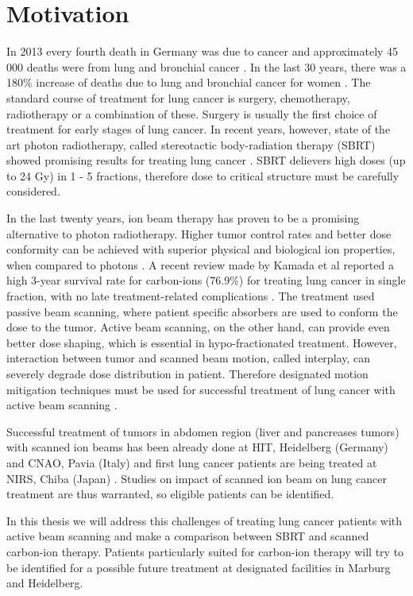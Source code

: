 \section*{Motivation}
In 2013 every fourth death in Germany was due to cancer and approximately 45 000 deaths were from lung and bronchial cancer \cite{Destatis2015}. In the last 30 years, there was a 180\% increase of deaths due to lung and bronchial cancer for women \cite{Destatis2015}.
The standard course of treatment for lung cancer is surgery, chemotherapy, radiotherapy or a combination of these. Surgery is usually the first choice of treatment for early stages of lung cancer. 
In recent years, however, state of the art photon radiotherapy, called stereotactic body-radiation therapy (SBRT) showed
promising results for treating lung cancer \cite{Baumann2009, Greco2011}. SBRT delievers high doses (up to 24 Gy) in 1 - 5 fractions, therefore dose to critical structure must be carefully considered.

In the last twenty years, ion beam therapy has proven to be a promising alternative to photon radiotherapy. Higher tumor control rates and better dose conformity can be achieved with superior physical and biological ion properties, when compared to photons \cite{Tsujii2008,Durante2010}.
A recent review made by Kamada et al reported a high 3-year survival rate for carbon-ions (76.9\%) for treating lung cancer in single fraction, with no late treatment-related complications \cite{Kamada2016}. 
The treatment used passive beam scanning, where patient specific absorbers are used to conform the dose to the tumor. Active beam scanning, on the other hand, can provide even better dose shaping, which is essential in hypo-fractionated treatment. 
However, interaction between tumor and scanned beam motion, called interplay, can severely degrade dose distribution in patient. Therefore designated motion mitigation techniques must be used for successful treatment of lung cancer with active beam scanning \cite{Bert2008}.

Successful treatment of tumors in abdomen region (liver and pancreases tumors) with scanned ion beams has been already done at HIT, Heidelberg (Germany) and CNAO, Pavia (Italy) \cite{Habermehl2013, Rossi2016} and first lung cancer patients are being treated at NIRS, Chiba (Japan) \cite{Mori2016}.
Studies on impact of scanned ion beam on lung cancer treatment are thus warranted, so eligible patients can be identified.

In this thesis we will address this challenges of treating lung cancer patients with active beam scanning and 
make a comparison between SBRT and scanned carbon-ion therapy. Patients particularly suited for carbon-ion therapy will try to be identified for a possible future treatment at designated facilities in Marburg and Heidelberg. 



